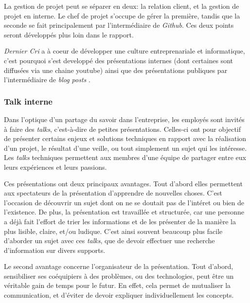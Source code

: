 \bigskip

La gestion de projet peut se séparer en deux: la relation client, et la
gestion de projet en interne. Le chef de projet s'occupe de gérer la
première, tandis que la seconde se fait principalement par
l'intermédiaire de \emph{Github}. Ces deux points seront développés plus
loin dans le rapport.

\bigskip

\emph{Dernier Cri} a à coeur de développer une culture entreprenariale
et informatique, c'est pourquoi s'est developpé des présentations
internes (dont certaines sont diffusées via une chaine youtube) ainsi
que des présentations publiques par l'intermédiaire de \emph{blog posts}
.

\subsubsection{Talk interne}\label{talk-interne}

\bigskip

Dans l'optique d'un partage du savoir dans l'entreprise, les employés
sont invités à faire des \emph{talks}, c'est-à-dire de petites
présentations. Celles-ci ont pour objectif de présenter certains enjeux
et solutions techniques en rapport avec la réalisation d'un projet, le
résultat d'une veille, ou tout simplement un sujet qui les intéresse.
Les \emph{talks} techniques permettent aux membres d'une équipe de
partager entre eux leurs expériences et leurs passions.

\bigskip

Ces présentations ont deux principaux avantages. Tout d'abord elles
permettent aux spectateurs de la présentation d'apprendre de nouvelles
choses. C'est l'occasion de découvrir un sujet dont on ne se doutait pas
de l'intéret ou bien de l'existence. De plus, la présentation est
travaillée et structurée, car une personne a déjà fait l'effort de trier
les informations et de les présenter de la manière la plus lisible,
claire, et/ou ludique. C'est ainsi souvent beaucoup plus facile
d'aborder un sujet avec ces \emph{talks}, que de devoir effectuer une
recherche d'information sur divers supports.

\bigskip

Le second avantage concerne l'organisateur de la présentation. Tout
d'abord, sensibiliser ses coéquipiers à des problèmes, ou des
technologies, peut être un véritable gain de temps pour le futur. En
effet, cela permet de mutualiser la communication, et d'éviter de devoir
expliquer individuellement les concepts.

